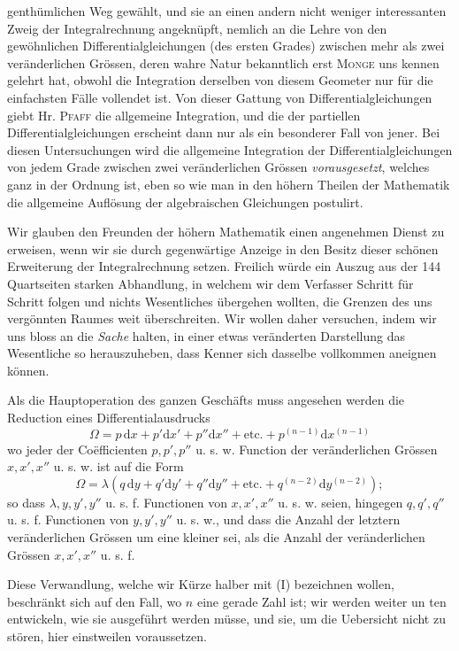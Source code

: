 genthümlichen Weg gewählt, und sie an einen andern nicht weniger interessanten Zweig der Integralrechnung angeknüpft, nemlich an die Lehre von den gewöhnlichen Differentialgleichungen (des ersten Grades) zwischen mehr als zwei veränderlichen Grössen, deren wahre Natur bekanntlich erst \textsc{Monge} uns kennen gelehrt hat, obwohl die Integration derselben von diesem Geometer nur für die einfachsten Fälle vollendet ist. Von dieser Gattung von Differentialgleichungen giebt Hr. \textsc{Pfaff} die allgemeine Integration, und die der partiellen Differentialgleichungen erscheint dann nur als ein besonderer Fall von jener. Bei diesen Untersuchungen wird die allgemeine Integration der Differentialgleichungen von jedem Grade zwischen zwei veränderlichen Grössen \textit{vorausgesetzt}, welches ganz in der Ordnung ist, eben so wie man in den höhern Theilen der Mathematik die allgemeine Auflösung der algebraischen Gleichungen postulirt.

Wir glauben den Freunden der höhern Mathematik einen angenehmen Dienst zu erweisen, wenn wir sie durch gegenwärtige Anzeige in den Besitz dieser schönen Erweiterung der Integralrechnung setzen. Freilich würde ein Auszug aus der 144 Quartseiten starken Abhandlung, in welchem wir dem Verfasser Schritt für Schritt folgen und nichts Wesentliches übergehen wollten, die Grenzen des uns vergönnten Raumes weit überschreiten. Wir wollen daher versuchen, indem wir uns bloss an die \textit{Sache} halten, in einer etwas veränderten Darstellung das Wesentliche so herauszuheben, dass Kenner sich dasselbe vollkommen aneignen können.

Als die Hauptoperation des ganzen Geschäfts muss angesehen werden die Reduction eines Differentialausdrucks
\[
\Omega=p\,\mathrm dx+p'\mathrm dx'+p''\mathrm dx''+\text{etc.}+p^{(n-1)}\mathrm dx^{(n-1)}
\]
wo jeder der Coëfficienten $p,p',p''$ u. s. w. Function der veränderlichen Grössen $x,x',x''$ u. s. w. ist auf die Form
\[
\Omega=\lambda(q\,\mathrm dy+q'\mathrm dy'+q''\mathrm dy''+\text{etc.}+q^{(n-2)}\mathrm dy^{(n-2)});
\]
so dass $\lambda,y,y',y''$ u. s. f. Functionen von $x,x',x''$ u. s. w. seien, hingegen $q,q',q''$ u. s. f. Functionen von $y,y',y''$ u. s. w., und dass die Anzahl der letztern veränderlichen Grössen um eine kleiner sei, als die Anzahl der veränderlichen Grössen $x,x',x''$ u. s. f.

Diese Verwandlung, welche wir Kürze halber mit (I) bezeichnen wollen, beschränkt sich auf den Fall, wo $n$ eine gerade Zahl ist; wir werden weiter un%
ten entwickeln, wie sie ausgeführt werden müsse, und sie, um die Uebersicht
nicht zu stören, hier einstweilen voraussetzen.
